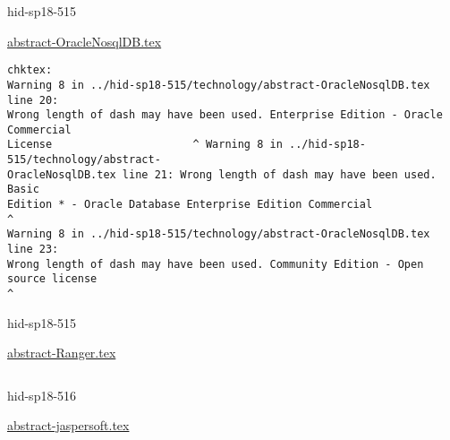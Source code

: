\begin{IU}

hid-sp18-515

\href{https://github.com/cloudmesh-community/hid-sp18-515/blob/master//technology/abstract-OracleNosqlDB.tex}{abstract-OracleNosqlDB.tex}

\begin{tiny}
\begin{verbatim}
chktex:
Warning 8 in ../hid-sp18-515/technology/abstract-OracleNosqlDB.tex line 20:
Wrong length of dash may have been used. Enterprise Edition - Oracle Commercial
License                      ^ Warning 8 in ../hid-sp18-515/technology/abstract-
OracleNosqlDB.tex line 21: Wrong length of dash may have been used. Basic
Edition * - Oracle Database Enterprise Edition Commercial                    ^
Warning 8 in ../hid-sp18-515/technology/abstract-OracleNosqlDB.tex line 23:
Wrong length of dash may have been used. Community Edition - Open source license
^
\end{verbatim}
\end{tiny}
\end{IU}



\begin{IU}

hid-sp18-515

\href{https://github.com/cloudmesh-community/hid-sp18-515/blob/master//technology/abstract-Ranger.tex}{abstract-Ranger.tex}

\begin{tiny}
\begin{verbatim}
\end{verbatim}
\end{tiny}
\end{IU}



\begin{IU}

hid-sp18-516

\href{https://github.com/cloudmesh-community/hid-sp18-516/blob/master//technology/abstract-jaspersoft.tex}{abstract-jaspersoft.tex}

\begin{tiny}
\begin{verbatim}
\end{verbatim}
\end{tiny}
\end{IU}

